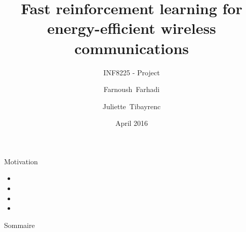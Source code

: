 \documentclass{beamer}
\title{Fast reinforcement learning for energy-efficient wireless communications}
\subtitle{INF8225 - Project}
\author{Farnoush~Farhadi \and Juliette~Tibayrenc}
\institute[Polytechnique Montréal] %
{
  Polytechnique Montréal
  }
\date{April 2016}
\begin{document}
\begin{frame}
  \titlepage
\end{frame}

\begin{frame}{Motivation}
\begin{itemize}
\item 
\item
\item
\item
\end{itemize}
\end{frame}

\begin{frame}{Sommaire}
  \tableofcontents
\end{frame}

\section{}    
\subsection{}
\end{document}
